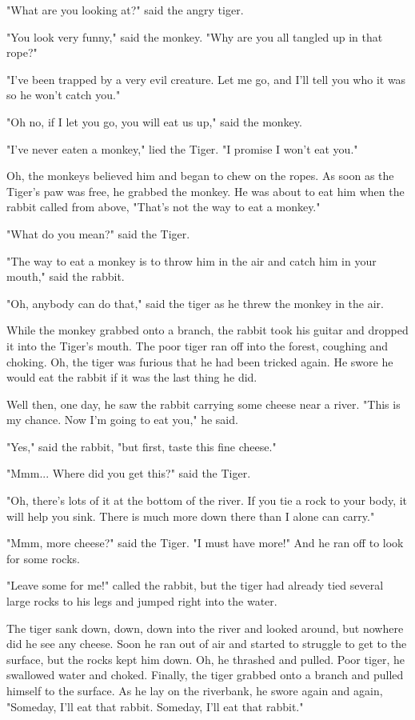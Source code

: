 "What are you looking at?" said the angry tiger.

"You look very funny," said the monkey. "Why are you all tangled up in that rope?"

"I've been trapped by a very evil creature. Let me go, and I'll tell you who it was so he won't catch you."

"Oh no, if I let you go, you will eat us up," said the monkey.

"I've never eaten a monkey," lied the Tiger. "I promise I won't eat you."

Oh, the monkeys believed him and began to chew on the ropes. As soon as the Tiger's paw was free, he grabbed the monkey. He was about to eat him when the rabbit called from above, "That's not the way to eat a monkey."

"What do you mean?" said the Tiger.

"The way to eat a monkey is to throw him in the air and catch him in your mouth," said the rabbit.

"Oh, anybody can do that," said the tiger as he threw the monkey in the air.

While the monkey grabbed onto a branch, the rabbit took his guitar and dropped it into the Tiger's mouth. The poor tiger ran off into the forest, coughing and choking. Oh, the tiger was furious that he had been tricked again. He swore he would eat the rabbit if it was the last thing he did.

Well then, one day, he saw the rabbit carrying some cheese near a river. "This is my chance. Now I'm going to eat you," he said.

"Yes," said the rabbit, "but first, taste this fine cheese."

"Mmm... Where did you get this?" said the Tiger.

"Oh, there's lots of it at the bottom of the river. If you tie a rock to your body, it will help you sink. There is much more down there than I alone can carry."

"Mmm, more cheese?" said the Tiger. "I must have more!" And he ran off to look for some rocks.

"Leave some for me!" called the rabbit, but the tiger had already tied several large rocks to his legs and jumped right into the water.

The tiger sank down, down, down into the river and looked around, but nowhere did he see any cheese. Soon he ran out of air and started to struggle to get to the surface, but the rocks kept him down. Oh, he thrashed and pulled. Poor tiger, he swallowed water and choked. Finally, the tiger grabbed onto a branch and pulled himself to the surface. As he lay on the riverbank, he swore again and again, "Someday, I'll eat that rabbit. Someday, I'll eat that rabbit."

